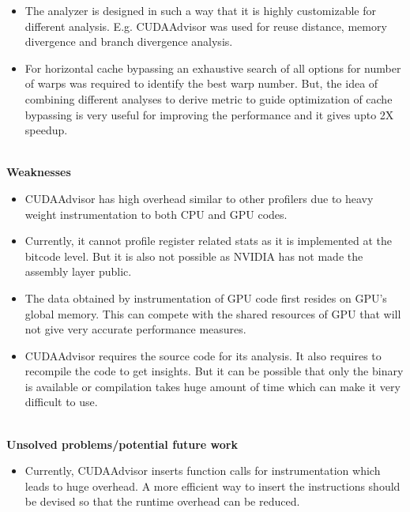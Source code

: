 \documentclass[20pt]{letter}
\begin{document}
\begin{enumerate}
{\begin{itemize}
    \item The analyzer is designed in such a way that it is highly customizable for different analysis. E.g. CUDAAdvisor was used for reuse distance, memory divergence and branch divergence analysis.\\ 

    \item For horizontal cache bypassing an exhaustive search of all options for number of warps was required to identify the best warp number. But, the idea of combining different analyses to derive metric to guide optimization of cache bypassing is very useful for improving the performance and it gives upto 2X speedup.
\end{itemize}

\textbf{\\Weaknesses}\\
\begin{itemize}
    \item CUDAAdvisor has high overhead similar to other profilers due to heavy weight instrumentation to both CPU and GPU codes.\\

    \item Currently, it cannot profile register related stats as it is implemented at the bitcode level. But it is also not possible as NVIDIA has not made the assembly layer public.\\

    \item The data obtained by instrumentation of GPU code first resides on GPU's global memory. This can compete with the shared resources of GPU that will not give very accurate performance measures.\\

    \item CUDAAdvisor requires the source code for its analysis. It also requires to recompile the code to get insights. But it can be possible that only the binary is available or compilation takes huge amount of time which can make it very difficult to use.
\end{itemize}

\textbf{\\Unsolved problems/potential future work}\\
\begin{itemize}
    \item Currently, CUDAAdvisor inserts function calls for instrumentation which leads to huge overhead. A more efficient way to insert the instructions should be devised so that the runtime overhead can be reduced.\\


\end{itemize}}
\end{enumerate}
\end{document}
